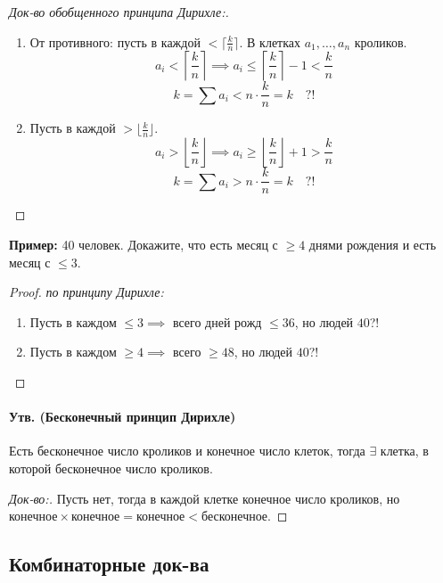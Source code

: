 \documentclass[10pt, a4paper]{article}
\begin{document}
\begin{proof}[Док-во обобщенного принципа Дирихле:]
\noindent 
\begin{enumerate}
    \item От противного: пусть в каждой $< \lceil \frac{k}{n} \rceil$. В клетках $a_1, \dots, a_n$ кроликов. \\
    \[ a_i < \left\lceil \frac{k}{n} \right\rceil \implies a_i \le \left\lceil \frac{k}{n} \right\rceil - 1 < \frac{k}{n} \]
    \[ k = \sum a_i < n \cdot \frac{k}{n} = k \quad ?! \]

    \item Пусть в каждой $> \lfloor \frac{k}{n} \rfloor$.
    \[ a_i > \left \lfloor \frac{k}{n} \right \rfloor \implies a_i \ge \left \lfloor \frac{k}{n} \right \rfloor + 1 > \frac{k}{n} \]
    \[ k = \sum a_i > n \cdot \frac{k}{n} = k \quad ?! \]
\end{enumerate}
\end{proof}

\textbf{Пример:} 40 человек. Докажите, что есть месяц с $\ge 4$ днями рождения и есть месяц с $\le 3$. \\

\begin{proof}{\textit{по принципу Дирихле:}}
\begin{enumerate}
    \item Пусть в каждом $\le 3 \implies$ всего дней рожд $\le 36$, но людей $40$?!
    
    \item Пусть в каждом $\ge 4 \implies$ всего $\ge 48$, но людей $40$?!
\end{enumerate}
\end{proof}

\paragraph{Утв. (Бесконечный принцип Дирихле)} 
Есть бесконечное число кроликов и конечное число клеток, тогда $\exists$ клетка, в которой бесконечное число кроликов.
\begin{proof}[Док-во:]
Пусть нет, тогда в каждой клетке конечное число кроликов, но $\text{конечное} \times \text{конечное} = \text{конечное} < \text{бесконечное}$.
\end{proof}

\subsection*{Комбинаторные док-ва}
\end{document}

